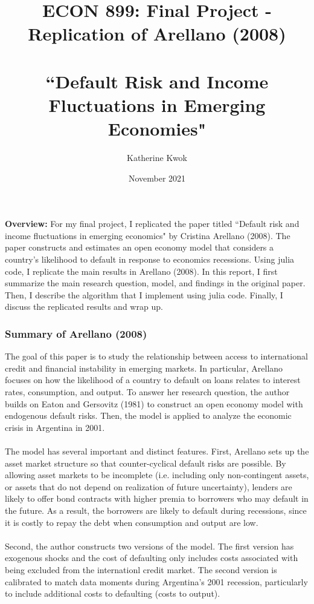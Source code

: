 \documentclass[12pt]{article}
\title{ECON 899: Final Project - Replication of Arellano (2008)\\\\{\large ``Default Risk and Income Fluctuations in Emerging Economies"}}
\author{Katherine Kwok}
\date{November 2021}
\begin{document}
\maketitle
\noindent \textbf{Overview:} For my final project, I replicated the paper titled ``Default risk and income fluctuations in emerging economics" by Cristina Arellano (2008). The paper constructs and estimates an open economy model that considers a country's likelihood to default in response to economics recessions. Using julia code, I replicate the main results in Arellano (2008). In this report, I first summarize the main research question, model, and findings in the original paper. Then, I describe the algorithm that I implement using julia code. Finally, I discuss the replicated results and wrap up.


\subsubsection*{Summary of Arellano (2008)}

The goal of this paper is to study the relationship between access to international credit and financial instability in emerging markets. In particular, Arellano focuses on how the likelihood of a country to default on loans relates to interest rates, consumption, and output. To answer her research question, the author builds on Eaton and Gersovitz (1981) to construct an open economy model with endogenous default risks. Then, the model is applied to analyze the economic crisis in Argentina in 2001. \\\\
The model has several important and distinct features. First, Arellano sets up the asset market structure so that counter-cyclical default risks are possible. By allowing asset markets to be incomplete (i.e. including only non-contingent assets, or assets that do not depend on realization of future uncertainty), lenders are likely to offer bond contracts with higher premia to borrowers who may default in the future. As a result, the borrowers are likely to default during recessions, since it is costly to repay the debt when consumption and output are low.\\\\
Second, the author constructs two versions of the model. The first version has exogenous shocks and the cost of defaulting only includes costs associated with being excluded from the internationl credit market. The second version is calibrated to match data moments during Argentina's 2001 recession, particularly to include additional costs to defaulting (costs to output).
\end{document}
